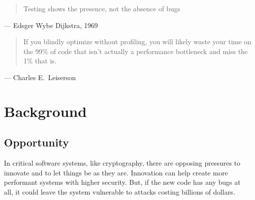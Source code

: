 \begin{quote}
  Testing shows the presence, not the absence of bugs
\end{quote}
\begin{flushright}
  --- Edsger Wybe Dijkstra, 1969~\cite{naur1969software}
\end{flushright}

\begin{quote}
  If you blindly optimize without profiling, you will likely waste your time on the 99\% of code that isn't actually a performance bottleneck and miss the 1\% that is.
\end{quote}
\begin{flushright}
  --- Charles E.~Leiserson~\cite{Profiling2020Leiserson}
\end{flushright}


\chapter{Background}\label{ch:intro}

\section{Opportunity}\label{sec:intro:intro}




In critical software systems, like cryptography, there are opposing pressures to innovate and to let things be as they are.
Innovation can help create more performant systems with higher security.
But, if the new code has any bugs at all, it could leave the system vulnerable to attacks costing billions of dollars.



